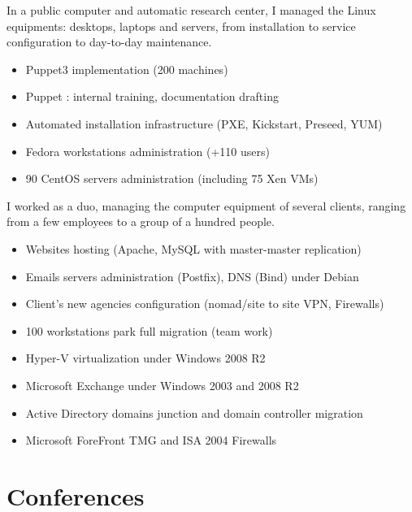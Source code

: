 \documentclass[12pt,a4paper,roman]{moderncv}          %
\begin{document}
{In a public computer and automatic research center, I managed the Linux equipments: desktops, laptops and servers, from installation to service configuration to day-to-day maintenance.
\begin{itemize}
  \item Puppet3 implementation (200 machines)
  \item Puppet : internal training, documentation drafting
  \item Automated installation infrastructure (PXE, Kickstart, Preseed, YUM)
  \item Fedora workstations administration (+110 users)
  \item 90 CentOS servers administration (including 75 Xen VMs)
\end{itemize}}


{I worked as a duo, managing the computer equipment of several clients, ranging from a few employees to a group of a hundred people.
\begin{itemize}
  \item Websites hosting (Apache, MySQL with master-master replication)
  \item Emails servers administration (Postfix), DNS (Bind) under Debian
  \item Client's new agencies configuration (nomad/site to site VPN, Firewalls)
  \item 100 workstations park full migration (team work)
  \item Hyper-V virtualization under Windows 2008 R2
  \item Microsoft Exchange under Windows 2003 and 2008 R2
  \item Active Directory domains junction and domain controller migration
  \item Microsoft ForeFront TMG and ISA 2004 Firewalls
\end{itemize}}



\section{Conferences}
\end{document}
